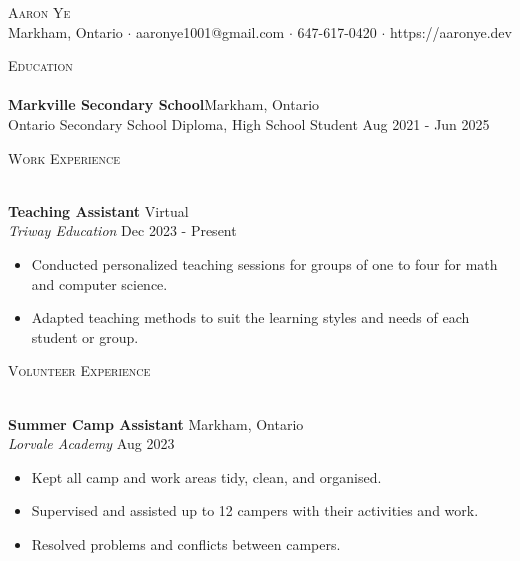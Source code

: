 \documentclass[a4paper,11pt,oneside,final]{article}
\newcommand{\lineunder} {
    \vspace*{-8pt} \\
    \hspace*{-18pt} \hrulefill \\
}
\newcommand{\header} [1] {
    {\hspace*{-18pt}\vspace*{6pt} \textsc{#1}}
    \vspace*{-6pt} \lineunder
}
\begin{document}
\vspace*{-40pt}

    

\vspace*{-10pt}
\begin{center}
	{\Huge \scshape {Aaron Ye}}\\
	Markham, Ontario $\cdot$ aaronye1001@gmail.com $\cdot$ 647-617-0420 $\cdot$ https://aaronye.dev\\
\end{center}

\header{Education}
\textbf{Markville Secondary School}\hfill Markham, Ontario\\
Ontario Secondary School Diploma, High School Student \hfill Aug 2021 - Jun 2025\\
\vspace{2mm}

\header{Work Experience}
\vspace{1mm}

\textbf{Teaching Assistant} \hfill Virtual\\
\textit{Triway Education} \hfill Dec 2023 - Present\\
\vspace{-1mm}
\begin{itemize} \itemsep 1pt
	\item Conducted personalized teaching sessions for groups of one to four for math and computer science.
	\item Adapted teaching methods to suit the learning styles and needs of each student or group.
\end{itemize}

\header{Volunteer Experience}
\vspace{1mm}

\textbf{Summer Camp Assistant} \hfill Markham, Ontario\\
\textit{Lorvale Academy} \hfill Aug 2023\\
\vspace{-1mm}
\begin{itemize} \itemsep 1pt
	\item Kept all camp and work areas tidy, clean, and organised.
	\item Supervised and assisted up to  12 campers with their activities and work.
	\item Resolved problems and conflicts between campers.
\end{itemize}
\end{document}
